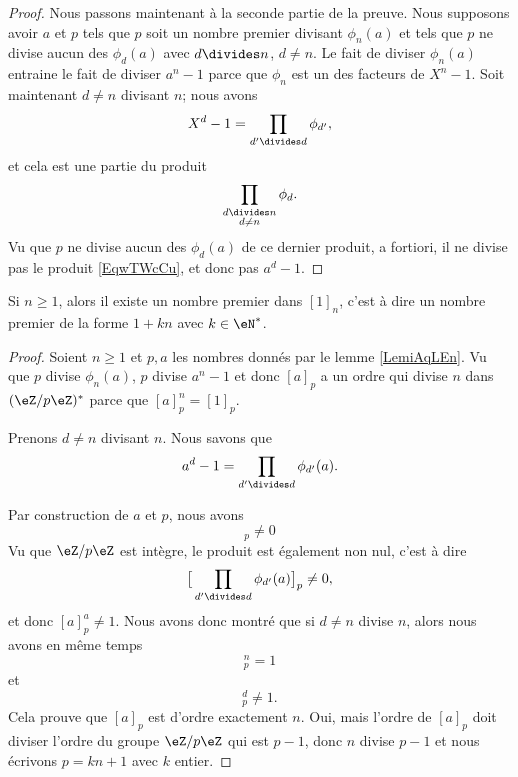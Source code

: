 \begin{proof}
    Nous passons maintenant à la seconde partie de la preuve. Nous supposons avoir \( a\) et \( p\) tels que \( p\) soit un nombre premier divisant \( \phi_n(a)\) et tels que \( p\) ne divise aucun des \( \phi_d(a)\) avec \( d\divides n\), \( d\neq n\). Le fait de diviser \( \phi_n(a)\) entraine le fait de diviser \( a^n-1\) parce que \( \phi_n\) est un des facteurs de \( X^n-1\). Soit maintenant \( d\neq n\) divisant \( n\); nous avons
    \begin{equation}    \label{EqwTWcCu}
        X^d-1=\prod_{d'\divides d}\phi_{d'},
    \end{equation}
    et cela est une partie du produit
    \begin{equation}
        \prod_{\substack{d\divides n\\d\neq n}}\phi_d.
    \end{equation}
    Vu que \( p\) ne divise aucun des \( \phi_d(a)\) de ce dernier produit, a fortiori, il ne divise pas le produit \ref{EqwTWcCu}, et donc pas \( a^d-1\).
\end{proof}

\begin{lemma}       \label{LemrZnmpG}
    Si \( n\geq 1\), alors il existe un nombre premier dans \( [1]_n\), c'est à dire un nombre premier de la forme \( 1+kn\) avec \( k\in \eN^*\). 
\end{lemma}

\begin{proof}
    Soient \( n\geq 1\) et \( p,a\) les nombres donnés par le lemme \ref{LemiAqLEn}. Vu que \( p\) divise \( \phi_n(a)\), \( p\) divise \( a^n-1\) et donc \( [a]_p\) a un ordre qui divise \( n\) dans \( (\eZ/p\eZ)^*\) parce que \( [a]_p^n=[1]_p\).

    Prenons \( d\neq n\) divisant \( n\). Nous savons que
    \begin{equation}
        a^d-1=\prod_{d'\divides d}\phi_{d'}(a).
    \end{equation}
    
    Par construction de \( a\) et \( p\), nous avons
    \begin{equation}
        [\phi_{d'}(a)]_p\neq 0
    \end{equation}
    Vu que \( \eZ/p\eZ\) est intègre, le produit est également non nul, c'est à dire
    \begin{equation}
        \big[ \prod_{d'\divides d}\phi_{d'}(a) \big]_p\neq 0,
    \end{equation}
    et donc \( [a]_p^a\neq 1\). Nous avons donc montré que si \( d\neq n\) divise \( n\), alors nous avons en même temps
    \begin{equation}
        [a]_p^n=1
    \end{equation}
    et
    \begin{equation}
        [a]_p^d\neq 1.
    \end{equation}
    Cela prouve que \( [a]_p\) est d'ordre exactement \( n\). Oui, mais l'ordre de \( [a]_p\) doit diviser l'ordre du groupe \( \eZ/p\eZ\) qui est \( p-1\), donc \( n\) divise \( p-1\) et nous écrivons \( p=kn+1\) avec \( k\) entier.
\end{proof}

